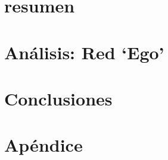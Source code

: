 


 



\section*{resumen}

\vspace{2em}

\tableofcontents
\newpage

% 


%

% 

\section{Análisis: Red `Ego'}

\newpage

\section{Conclusiones}

\newpage

\section{Apéndice}

\newpage



